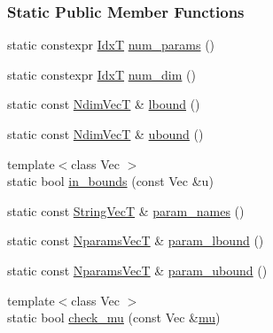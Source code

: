 \subsubsection*{Static Public Member Functions}
\begin{DoxyCompactItemize}
\item 
static constexpr \hyperlink{namespaceprior__hessian_aa8d589f74e88bfa3b5750118acd1ab78}{IdxT} \hyperlink{classprior__hessian_1_1MultivariateNormalDist_a9a2d3e50448adb594ed60a92d2942943}{num\+\_\+params} ()
\item 
static constexpr \hyperlink{namespaceprior__hessian_aa8d589f74e88bfa3b5750118acd1ab78}{IdxT} \hyperlink{classprior__hessian_1_1MultivariateNormalDist_a99b496bd355946a89e6563375dcf5d7a}{num\+\_\+dim} ()
\item 
static const \hyperlink{classprior__hessian_1_1MultivariateNormalDist_a0f5725cbbfa47be45b2741467dcd5615}{Ndim\+VecT} \& \hyperlink{classprior__hessian_1_1MultivariateNormalDist_a492a872d5cfb8838225ac782b801a865}{lbound} ()
\item 
static const \hyperlink{classprior__hessian_1_1MultivariateNormalDist_a0f5725cbbfa47be45b2741467dcd5615}{Ndim\+VecT} \& \hyperlink{classprior__hessian_1_1MultivariateNormalDist_a80a35218c42430f7a5162229779f1492}{ubound} ()
\item 
{\footnotesize template$<$class Vec $>$ }\\static bool \hyperlink{classprior__hessian_1_1MultivariateNormalDist_aedb257f189a46f8b1ee36a1b344648c3}{in\+\_\+bounds} (const Vec \&u)
\item 
static const \hyperlink{namespaceprior__hessian_a61fc0176249462ee94fe3cca92cf3f8c}{String\+VecT} \& \hyperlink{classprior__hessian_1_1MultivariateNormalDist_ad9330423616166e7062b9c70c1d54358}{param\+\_\+names} ()
\item 
static const \hyperlink{classprior__hessian_1_1MultivariateNormalDist_ac690a8a9b00e4e0e159a15bb9c212852}{Nparams\+VecT} \& \hyperlink{classprior__hessian_1_1MultivariateNormalDist_a4d070bbd6455931c57ac1bb924f32777}{param\+\_\+lbound} ()
\item 
static const \hyperlink{classprior__hessian_1_1MultivariateNormalDist_ac690a8a9b00e4e0e159a15bb9c212852}{Nparams\+VecT} \& \hyperlink{classprior__hessian_1_1MultivariateNormalDist_aa0eeb70f83993bb6553b36d01aadec17}{param\+\_\+ubound} ()
\item 
{\footnotesize template$<$class Vec $>$ }\\static bool \hyperlink{classprior__hessian_1_1MultivariateNormalDist_af202c613f03a8d07d9ab80ead9f4064b}{check\+\_\+mu} (const Vec \&\hyperlink{classprior__hessian_1_1MultivariateNormalDist_a53e894d82ca08f285fc004b77301495d}{mu})

\end{DoxyCompactItemize}

